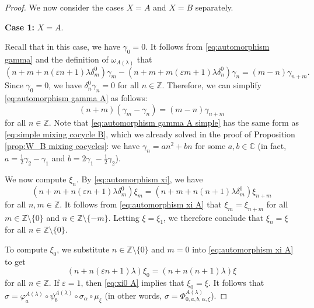 \documentclass[11pt, svgnames]{amsart}
\newcommand{\ZZ}{\mathbb{Z}}
\newcommand{\CC}{\mathbb{C}}
\newcommand{\nonzero}{\setminus \{0\}}
\newcommand{\case}[2]{\vspace{2mm} \textbf{Case #1:} #2 \vspace{2mm}}
\theoremstyle{definition}
\begin{document}
\begin{proof}
    We now consider the cases $X = A$ and $X = B$ separately.

    \case{1}{$X = A$.}
    
    Recall that in this case, we have $\gamma_0 = 0$. It follows from \eqref{eq:automorphism gamma} and the definition of $\omega_{A(\lambda)}$ that
    \begin{equation}\label{eq:automorphism gamma A}
        (n + m + n(\varepsilon n + 1)\lambda \delta_m^0)\gamma_m - (n + m + m(\varepsilon m + 1)\lambda \delta_n^0)\gamma_n = (m - n)\gamma_{n+m}.
    \end{equation}
    Since $\gamma_0 = 0$, we have $\delta_n^0 \gamma_n = 0$ for all $n \in \ZZ$. Therefore, we can simplify \eqref{eq:automorphism gamma A} as follows:
    \begin{equation}\label{eq:automorphism gamma A simple}
        (n + m)(\gamma_m - \gamma_n) = (m - n)\gamma_{n+m}
    \end{equation}
    for all $n \in \ZZ$. Note that \eqref{eq:automorphism gamma A simple} has the same form as \eqref{eq:simple mixing cocycle B}, which we already solved in the proof of Proposition \ref{prop:W_B mixing cocycles}: we have $\gamma_n = a n^2 + b n$ for some $a,b \in \CC$ (in fact, $a = \frac{1}{2}\gamma_2 - \gamma_1$ and $b = 2\gamma_1 - \frac{1}{2}\gamma_2$).

    We now compute $\xi_n$. By \eqref{eq:automorphism xi}, we have
    \begin{equation}\label{eq:automorphism xi A}
        (n + m + n(\varepsilon n + 1)\lambda \delta_m^0)\xi_m = (n + m + n(n + 1)\lambda \delta_m^0)\xi_{n+m}
    \end{equation}
    for all $n,m \in \ZZ$. It follows from \eqref{eq:automorphism xi A} that $\xi_m = \xi_{n+m}$ for all $m \in \ZZ \nonzero$ and $n \in \ZZ \setminus \{-m\}$. Letting $\xi = \xi_1$, we therefore conclude that $\xi_n = \xi$ for all $n \in \ZZ \nonzero$.

    To compute $\xi_0$, we substitute $n \in \ZZ \nonzero$ and $m = 0$ into \eqref{eq:automorphism xi A} to get
    \begin{equation}\label{eq:xi0 A}
        (n + n(\varepsilon n + 1)\lambda)\xi_0 = (n + n(n + 1)\lambda)\xi
    \end{equation}
    for all $n \in \ZZ$. If $\varepsilon = 1$, then \eqref{eq:xi0 A} implies that $\xi_0 = \xi$. It follows that $\sigma = \varphi_a^{A(\lambda)} \circ \psi_b^{A(\lambda)} \circ \sigma_\alpha \circ \mu_\xi$ (in other words, $\sigma = \Phi^{A(\lambda)}_{0,a,b,\alpha,\xi}$).
    

\end{proof}
\end{document}
